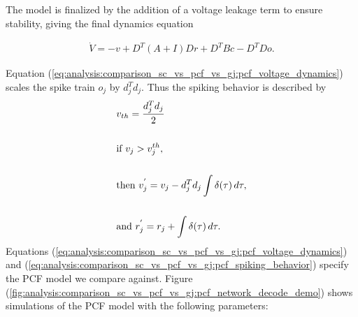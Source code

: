 \begin{enumerate}
The model is finalized by the addition of a voltage leakage term to ensure stability, giving the final dynamics equation

\begin{align}
\label{eq:analysis:comparison_sc_vs_pcf_vs_gj:pcf_voltage_dynamics}
\dot{V} = -v
+ D^T 
\left(
A + I
\right)
D r
+ 
D^T B c
- D^T D o.
\end{align}

Equation (\ref{eq:analysis:comparison_sc_vs_pcf_vs_gj:pcf_voltage_dynamics}) scales the spike train $o_j$ by $d_j^T d_j$. Thus the spiking behavior is described by
\begin{align}
\label{eq:analysis:comparison_sc_vs_pcf_vs_gj:pcf_spiking_behavior}
    &v_{th} = \frac{ d_j^T d_j }{2} \notag \\
    \notag \\
    &\text{if  } v_j > v^{th}_j,\notag \\
    \\
    &\text{then  } v_j^{'} = v_j - d_j^T d_j \int \delta(\tau)  \, d\tau ,\notag \\
    \notag \\ 
    &\text{and  } r_j^{'} = r_j + \int \delta(\tau)  \, d\tau \notag.
\end{align}
Equations (\ref{eq:analysis:comparison_sc_vs_pcf_vs_gj:pcf_voltage_dynamics}) and (\ref{eq:analysis:comparison_sc_vs_pcf_vs_gj:pcf_spiking_behavior}) specify the PCF model we compare against. Figure (\ref{fig:analysis:comparison_sc_vs_pcf_vs_gj:pcf_network_decode_demo}) shows simulations of the PCF model with the following parameters:


\end{enumerate}
